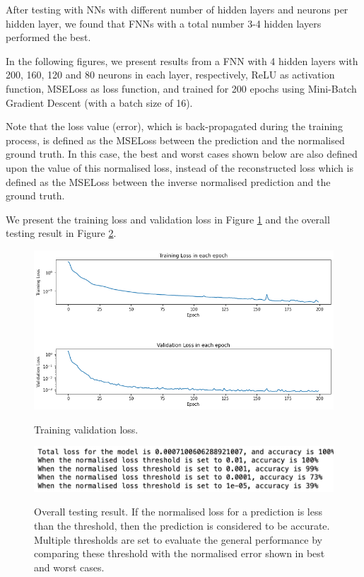 After testing with NNs with different number of hidden layers and neurons per hidden layer, we found that FNNs with a total number 3-4 hidden layers performed the best.

In the following figures, we present results from a FNN with 4 hidden layers with 200, 160, 120 and 80 neurons in each layer, respectively, ReLU as activation function, MSELoss as loss function, and trained for 200 epochs using Mini-Batch Gradient Descent (with a batch size of 16).

Note that the loss value (error), which is back-propagated during the training process, is defined as the MSELoss between the prediction and the normalised ground truth. In this case, the best and worst cases shown below are also defined upon the value of this normalised loss, instead of the reconstructed loss which is defined as the MSELoss between the inverse normalised prediction and the ground truth.

We present the training loss and validation loss in Figure \ref{figure:geoid_losses} and the overall testing result in Figure \ref{figure:geoid_testing}.

\begin{figure}[H]
    \caption{Training validation loss.}
    \includegraphics[scale=0.6]{figures/geoid_images/Geoid_trainingData.png}
    \label{figure:geoid_losses}
\end{figure}

\begin{figure}[H]
    \caption{Overall testing result. If the normalised loss for a prediction is less than the threshold, then the prediction is considered to be accurate. Multiple thresholds are set to evaluate the general performance by comparing these threshold with the normalised error shown in best and worst cases.}
    \includegraphics[scale=0.8]{figures/geoid_images/Geoid_OverallTesting.png}
    \label{figure:geoid_testing}
\end{figure}

